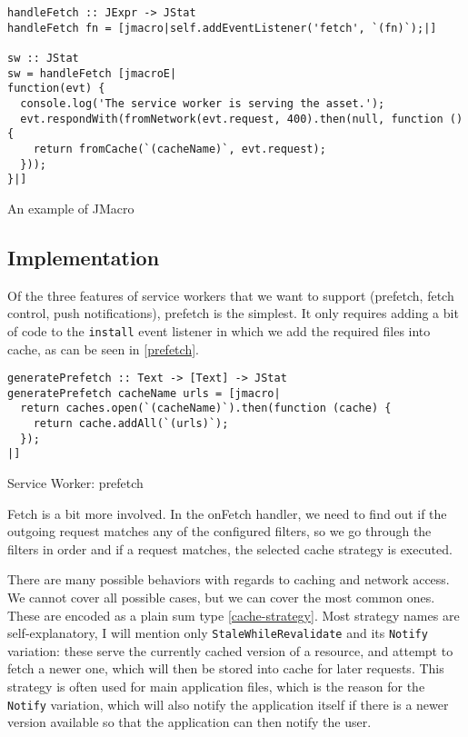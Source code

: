 \documentclass[english,odsaz]{fitthesis}
\begin{document}
\begin{listing}[htbp]
\begin{verbatim}
handleFetch :: JExpr -> JStat
handleFetch fn = [jmacro|self.addEventListener('fetch', `(fn)`);|]

sw :: JStat
sw = handleFetch [jmacroE|
function(evt) {
  console.log('The service worker is serving the asset.');
  evt.respondWith(fromNetwork(evt.request, 400).then(null, function () {
    return fromCache(`(cacheName)`, evt.request);
  }));
}|]
\end{verbatim}
\caption{An example of JMacro \label{jmacro}}
\end{listing}

\subsection{Implementation}
\label{sec:org7d3ffa6}
Of the three features of service workers that we want to support (prefetch,
fetch control, push notifications), prefetch is the simplest. It only requires
adding a bit of code to the \texttt{install} event listener in which we add the required
files into cache, as can be seen in \ref{prefetch}.

\begin{listing}[htbp]
\begin{verbatim}
generatePrefetch :: Text -> [Text] -> JStat
generatePrefetch cacheName urls = [jmacro|
  return caches.open(`(cacheName)`).then(function (cache) {
    return cache.addAll(`(urls)`);
  });
|]
\end{verbatim}
\caption{Service Worker: prefetch \label{prefetch}}
\end{listing}

Fetch is a bit more involved. In the onFetch handler, we need to find out if the
outgoing request matches any of the configured filters, so we go through the
filters in order and if a request matches, the selected cache strategy is
executed.

There are many possible behaviors with regards to caching and network access. We
cannot cover all possible cases, but we can cover the most common ones. These
are encoded as a plain sum type \ref{cache-strategy}. Most strategy names are
self-explanatory, I will mention only \texttt{StaleWhileRevalidate} and its \texttt{Notify}
variation: these serve the currently cached version of a resource, and attempt
to fetch a newer one, which will then be stored into cache for later
requests. This strategy is often used for main application files, which is the
reason for the \texttt{Notify} variation, which will also notify the application itself
if there is a newer version available so that the application can then notify
the user.
\end{document}
